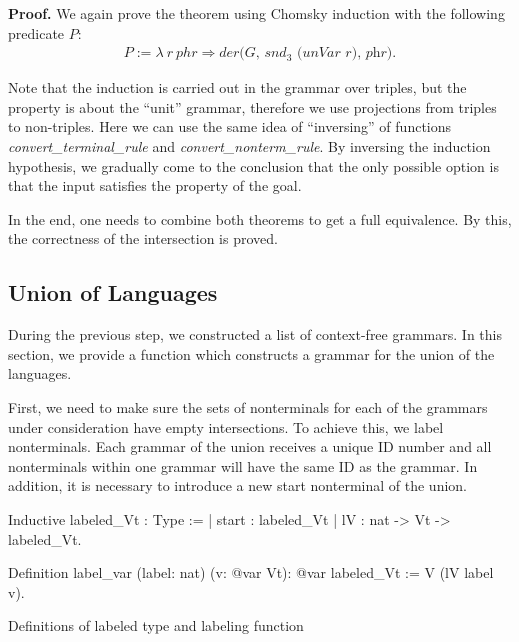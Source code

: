 \textbf{Proof.} 
We again prove the theorem using Chomsky induction with the following predicate $P$:
\begin{align*}
P :=  \lambda \ r \ phr \Rightarrow \textit{der(G, $snd_3$ (unVar r), phr)}.
\end{align*}

Note that the induction is carried out in the grammar over triples, but the property is about the ``unit'' grammar, therefore we use projections from triples to non-triples.
Here we can use the same idea of ``inversing'' of functions \textit{convert\_terminal\_rule} and \textit{convert\_nonterm\_rule}.
By inversing the induction hypothesis, we gradually come to the conclusion that the only possible option is that the input satisfies the property of the goal. 

 


In the end, one needs to combine both theorems to get a full equivalence. By this, the correctness of the intersection is proved.

\subsection{Union of Languages}

During the previous step, we constructed a list of context-free grammars. In this section, we provide a function which constructs a grammar for the union of the languages.

First, we need to make sure the sets of nonterminals for each of the grammars under consideration have empty intersections. To achieve this, we label nonterminals. Each grammar of the union receives a unique ID number and all nonterminals within one grammar will have the same ID as the grammar. In addition, it is necessary to introduce a new start nonterminal of the union.

\begin{listing}[h]
    \begin{pyglist}[language=coq, numbers=none, numbersep=5pt]
  Inductive labeled_Vt : Type :=
  | start : labeled_Vt
  | lV : nat -> Vt -> labeled_Vt.
  
  Definition label_var (label: nat) 
                       (v: @var Vt): @var 
                       labeled_Vt :=
    V (lV label v).  
    \end{pyglist}
    \caption{Definitions of labeled type and labeling function}
    \label{lst:verbments1}
\end{listing}


